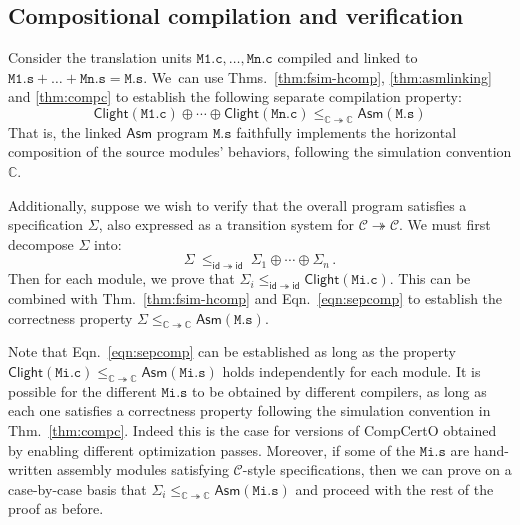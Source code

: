 \documentclass[11pt,oneside]{book}
\theoremstyle{definition}
\newcommand{\kw}[1]{\ensuremath{ \mathsf{#1} }}
\begin{document}

\subsection{Compositional compilation and verification} \label{sec:cver} %

Consider the translation units
$\mathtt{M1.c}, \ldots, \mathtt{Mn.c}$
compiled and linked to
$\mathtt{M1.s} + \ldots + \mathtt{Mn.s} = \mathtt{M.s}$.
We~can use
Thms.~\ref{thm:fsim-hcomp},
\ref{thm:asmlinking} and
\ref{thm:compc}
to establish the following separate compilation property:
\begin{equation}
  \label{eqn:sepcomp}
  \kw{Clight}(\mathtt{M1.c}) \oplus \cdots \oplus \kw{Clight}(\mathtt{Mn.c})
  \le_{\mathbb{C} \twoheadrightarrow \mathbb{C}}
  \kw{Asm}(\mathtt{M.s})
\end{equation}
That is,
the linked \kw{Asm} program
$\mathtt{M.s}$
faithfully implements
the horizontal composition of the source modules' behaviors,
following the simulation convention $\mathbb{C}$.

Additionally,
suppose we wish to verify that the overall program
satisfies a specification $\Sigma$,
also expressed as a transition system
for $\mathcal{C} \twoheadrightarrow \mathcal{C}$.
We must first decompose $\Sigma$
into:
\[
    \Sigma \: \le_{\kw{id} \twoheadrightarrow \kw{id}} \:
    \Sigma_1 \oplus \cdots \oplus \Sigma_n \,.
\]
Then for each module, we prove that
$\Sigma_i \le_{\kw{id} \twoheadrightarrow \kw{id}} \kw{Clight}(\mathtt{Mi.c})$.
This can be combined with Thm.~\ref{thm:fsim-hcomp} and Eqn.~\ref{eqn:sepcomp}
to establish the correctness property
$\Sigma \le_{\mathbb{C} \twoheadrightarrow \mathbb{C}}
        \kw{Asm}(\mathtt{M.s})$.

Note that Eqn.~\ref{eqn:sepcomp} can be established
as long as the property
$\kw{Clight}(\mathtt{Mi.c})
 \le_{\mathbb{C} \twoheadrightarrow \mathbb{C}}
 \kw{Asm}(\mathtt{Mi.s})$
holds independently for each module.
It is possible for the different $\mathtt{Mi.s}$
to be obtained by different compilers,
as long as each one satisfies a correctness property
following the simulation convention in Thm.~\ref{thm:compc}.
Indeed this is the case for versions of CompCertO
obtained by enabling different optimization passes.
Moreover, if some of the $\mathtt{Mi.s}$
are hand-written assembly modules satisfying
$\mathcal{C}$-style specifications,
then we can prove on a case-by-case basis that
$\Sigma_i \le_{\mathbb{C} \twoheadrightarrow \mathbb{C}} \kw{Asm}(\mathtt{Mi.s})$
and proceed with the rest of the proof as before.
\end{document}
